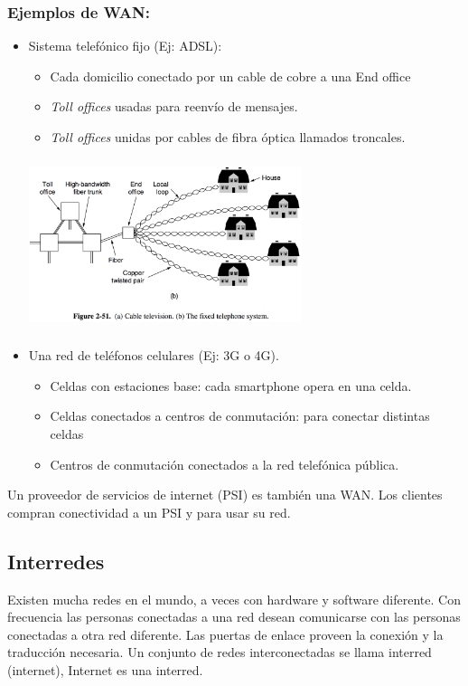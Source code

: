 \documentclass[10pt,a4paper]{report}
\begin{document}
\subsubsection{Ejemplos de WAN:}
\begin{itemize}
\item Sistema telefónico fijo (Ej: ADSL):
\begin{itemize}
	\item Cada domicilio conectado por un cable de cobre a una End office
 	\item \textit{Toll offices} usadas para reenvío de mensajes.
 	\item \textit{Toll offices} unidas por cables de fibra óptica llamados troncales.
\end{itemize}	

\begin{center} 
	\includegraphics[width=8cm, height=5cm]{./imagenes/telefonico.png} 
\end{center}

\item Una red de teléfonos celulares (Ej: 3G o 4G).
\begin{itemize}
	\item Celdas con estaciones base: cada smartphone opera en una celda.
	\item Celdas conectados a centros de conmutación: para conectar distintas celdas
 	\item Centros de conmutación conectados a la red telefónica pública.
\end{itemize}

\end{itemize}

\par Un proveedor de servicios de internet (PSI) es también una WAN. Los clientes compran conectividad a un PSI y para usar su red.

\subsection{Interredes}
\par Existen mucha redes en el mundo, a veces con hardware y software diferente. 
Con frecuencia las personas conectadas a una red desean comunicarse con las 
personas conectadas a otra red diferente. Las puertas de enlace proveen la conexión y 
la traducción necesaria. Un conjunto de redes interconectadas se llama interred 
(internet), Internet es una interred.
\end{document}
